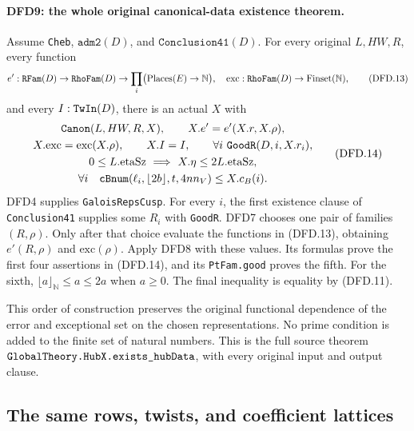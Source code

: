 \paragraph{DFD9: the whole original canonical-data existence theorem.}
\label{claim:DFD9}
Assume \texttt{Cheb}, $\texttt{adm2}(D)$, and
$\texttt{Conclusion41}(D)$. For every original $L,HW,R$,
every function
\[
 e':\texttt{RFam}(D)\to\texttt{Rho\allowbreak Fam}(D)\to
          \prod_i\bigl(\operatorname{Places}(E)\to\mathbb N\bigr),
 \quad
 \mathrm{exc}:\texttt{Rho\allowbreak Fam}(D)\to\operatorname{Finset}(\mathbb N),
                                                               \tag{DFD.13}
\]
and every $I:\texttt{Tw\allowbreak In}(D)$, there is an actual $X$ with
\[
 \begin{gathered}
 \texttt{Canon}(L,HW,R,X),\qquad X.e'=e'(X.r,X.\rho),\\
 X.\mathrm{exc}=\mathrm{exc}(X.\rho),\qquad X.I=I,
 \qquad\forall i\ \texttt{Good\allowbreak R}(D,i,X.r_i),\\
 0\le L.\mathrm{etaSz}\ \Longrightarrow\
          X.\eta\le2L.\mathrm{etaSz},\\
 \forall i\quad
 \texttt{c\allowbreak Bnum}(\ell_i,\lfloor2b\rfloor,t,4nn_V)\le X.c_B(i).
 \end{gathered}                                         \tag{DFD.14}
\]
DFD4 supplies \texttt{Galois\allowbreak Reps\allowbreak Cusp}. For every $i$, the
first existence clause of \texttt{Conclusion41} supplies
some $R_i$ with \texttt{Good\allowbreak R}. DFD7 chooses one pair of
families $(R,\rho)$. Only after that choice evaluate the
functions in (DFD.13), obtaining $e'(R,\rho)$ and
$\mathrm{exc}(\rho)$. Apply DFD8 with these values.
Its formulas prove the first four assertions in (DFD.14),
and its \texttt{Pt\allowbreak Fam.good} proves the fifth. For the sixth,
$\lfloor a\rfloor_{\mathbb N}\le a\le2a$ when $a\ge0$.
The final inequality is equality by (DFD.11).

This order of construction preserves the original functional
dependence of the error and exceptional set on the chosen
representations. No prime condition is added to the finite
set of natural numbers. This is the full source theorem
$\texttt{Global\allowbreak Theory.Hub\allowbreak X.exists\_\allowbreak hub\allowbreak Data}$, with every
original input and output clause.

\subsection{The same rows, twists, and coefficient lattices}

